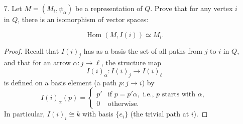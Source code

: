 \documentclass[12pt]{amsart}
\begin{document}
\begin{enumerate}
\begin{proof}
    \noindent\textbf{Resolution of $S(2)$.}
    There are two arrows starting at $2$, namely
    \[
    \gamma:2\to 3,
    \qquad
    \delta:2\to 4.
    \]
    Hence
    \[
    \operatorname{rad} P(2)\cong P(3)\oplus P(4).
    \]
    Therefore
    \[
    0 \longrightarrow P(3)\oplus P(4)
    \xrightarrow{\;h\;}
    P(2)
    \xrightarrow{\;\pi_2\;}
    S(2)
    \longrightarrow 0
    \]
    is exact, where $h=(\iota_\gamma,\iota_\delta)$ and:
    \begin{itemize}
        \item $\iota_\gamma:P(3)\to P(2)$ sends the generator of $P(3)_3\cong k$ to
        \[
        \gamma \in P(2)_3\cong k;
        \]
        \item $\iota_\delta:P(4)\to P(2)$ sends the generator of $P(4)_4\cong k$ to
        \[
        \delta \in P(2)_4\cong k^2.
        \]
    \end{itemize}
    The image of $h$ is exactly the radical of $P(2)$, so this is the minimal projective resolution of $S(2)$.
    
    \medskip
    \noindent\textbf{Resolution of $S(1)$.}
    There are two arrows starting at $1$, namely
    \[
    \alpha:1\to 2,
    \qquad
    \beta:1\to 3.
    \]
    Thus
    \[
    \operatorname{rad} P(1)\cong P(2)\oplus P(3).
    \]
    Hence we have the exact sequence
    \[
    0 \longrightarrow P(2)\oplus P(3)
    \xrightarrow{\;u\;}
    P(1)
    \xrightarrow{\;\pi_1\;}
    S(1)
    \longrightarrow 0,
    \]
    where $u=(\iota_\alpha,\iota_\beta)$ and:
    \begin{itemize}
        \item $\iota_\alpha:P(2)\to P(1)$ sends the generator of $P(2)_2\cong k$ to
        \[
        \alpha \in P(1)_2\cong k;
        \]
        \item $\iota_\beta:P(3)\to P(1)$ sends the generator of $P(3)_3\cong k$ to
        \[
        \beta \in P(1)_3\cong k^2.
        \]
    \end{itemize}
    Its image is $\operatorname{rad} P(1)$, so this yields the minimal projective resolution of $S(1)$.
\end{proof}


\item[7.] Let $M=(M_i,\psi_{\alpha})$ be a representation of $Q$. Prove that for any vertex $i$ in $Q$, there is an isomorphism of vector
spaces: 

$$\operatorname{Hom}(M,I(i))\simeq M_i.$$

\begin{proof}
    Recall that $I(i)_j$ has as a basis the set of all paths from $j$ to $i$ in $Q$, and that for an arrow $\alpha\colon j\to \ell$, the structure map
    \[
    I(i)_\alpha\colon I(i)_j\to I(i)_\ell
    \]
    is defined on a basis element (a path $p\colon j\to i$) by
    \[
    I(i)_\alpha(p)=
    \begin{cases}
    p' & \text{if } p=p'\alpha, \text{ i.e., } p \text{ starts with } \alpha,\\
    0 & \text{otherwise.}
    \end{cases}
    \]
    In particular, $I(i)_i\cong k$ with basis $\{e_i\}$ (the trivial path at $i$).


\end{proof}
\end{enumerate}
\end{document}
